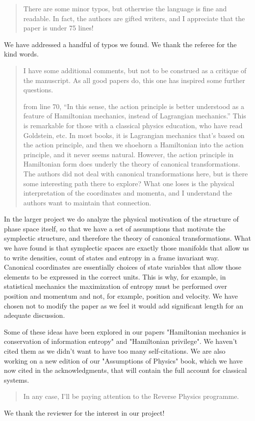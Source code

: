 \documentclass[11pt, executivepaper]{article}
\begin{document}
\begin{quote}
There are some minor typos, but otherwise the language is fine and readable. In fact, the authors are gifted writers, and I appreciate that the paper is under 75 lines!
\end{quote}
We have addressed a handful of typos we found. We thank the referee for the kind words.

\begin{quote}
I have some additional comments, but not to be construed as a critique of the manuscript. As all good papers do, this one has inspired some further questions. 

from line 70, “In this sense, the action principle is better understood as a feature of Hamiltonian mechanics, instead of Lagrangian mechanics.” This is remarkable for those with a classical physics education, who have read Goldstein, etc. In most books, it is Lagrangian mechanics that’s based on the action principle, and then we shoehorn a Hamiltonian into the action principle, and it never seems natural. However, the action principle in Hamiltonian form does underly the theory of canonical transformations. The authors did not deal with canonical transformations here, but is there some interesting path there to explore? What one loses is the physical interpretation of the coordinates and momenta, and I understand the authors want to maintain that connection.
\end{quote}
In the larger project we do analyze the physical motivation of the structure of phase space itself, so that we have a set of assumptions that motivate the symplectic structure, and therefore the theory of canonical transformations. What we have found is that symplectic spaces are exactly those manifolds that allow us to write densities, count of states and entropy in a frame invariant way. Canonical coordinates are essentially choices of state variables that allow those elements to be expressed in the correct units. This is why, for example, in statistical mechanics the maximization of entropy must be performed over position and momentum and not, for example, position and velocity. We have chosen not to modify the paper as we feel it would add significant length for an adequate discussion.

Some of these ideas have been explored in our papers "Hamiltonian mechanics is conservation of information entropy" and "Hamiltonian privilege". We haven't cited them as we didn't want to have too many self-citations. We are also working on a new edition of our "Assumptions of Physics" book, which we have now cited in the acknowledgments, that will contain the full account for classical systems.

\begin{quote}
In any case, I'll be paying attention to the Reverse Physics programme.
\end{quote}
We thank the reviewer for the interest in our project!

 
\clearpage


\end{document}
